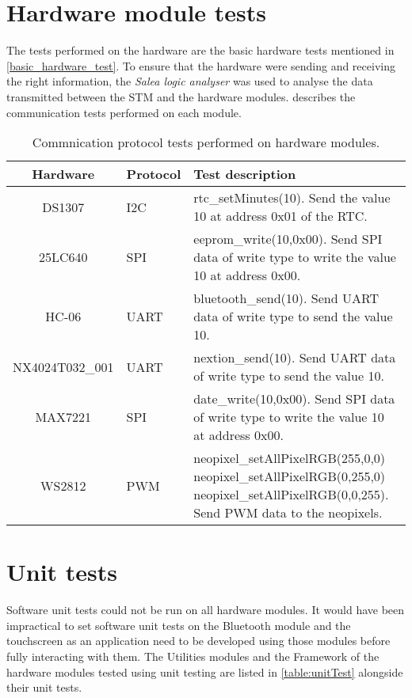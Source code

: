 \section{Hardware module tests}
The tests performed on the hardware are the basic hardware tests mentioned in \ref{basic_hardware_test}.
To ensure that the hardware were sending and receiving the right information, the \textit{Salea logic analyser} was used to analyse the data transmitted between the STM and the hardware modules. describes the communication tests performed on each module.

\begin{table}[h!]
	\centering
	\caption{Commnication protocol tests performed on hardware modules.}
	\label{table:coms_test}
	\begin{tabular}{cp{5em}p{25em}}
		\hline
		\hline
		\toprule
		\textbf{Hardware} & \textbf{Protocol} & \textbf{Test description}\\
		\hline
		\hline
		\toprule
		DS1307 & I2C & rtc\_setMinutes(10). Send the value 10 at address 0x01 of the RTC.\\ 
		\midrule
		25LC640 & SPI & eeprom\_write(10,0x00). Send SPI data of write type to write the value 10 at address 0x00.\\ 
		\midrule
		HC-06 & UART & bluetooth\_send(10). Send UART data of write type to send the value 10.\\ 
		\midrule
		NX4024T032\_001 & UART & nextion\_send(10). Send UART data of write type to send the value 10.\\ 
		\midrule
		MAX7221 & SPI &  date\_write(10,0x00). Send SPI data of write type to write the value 10 at address 0x00.\\
		\midrule
		WS2812 & PWM &  neopixel\_setAllPixelRGB(255,0,0) neopixel\_setAllPixelRGB(0,255,0) neopixel\_setAllPixelRGB(0,0,255). Send PWM data to the neopixels.\\
		\hline
		\hline
	\end{tabular}
\end{table}



\section{Unit tests}

Software unit tests could not be run on all hardware modules. It would have been impractical to set software unit tests on the Bluetooth module and the touchscreen as an application need to be developed using those modules before fully interacting with them. The Utilities modules and the Framework of the hardware modules tested using unit testing are listed in \cref{table:unitTest} alongside their unit tests.

